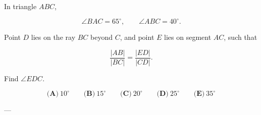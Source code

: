 In triangle \(ABC\),



\[
\angle BAC=65^\circ,\qquad \angle ABC=40^\circ.
\]

Point \(D\) lies on the ray \(BC\) beyond \(C\), and point \(E\) lies on segment \(AC\), such that



\[
\dfrac{|AB|}{|BC|}=\dfrac{|ED|}{|CD|}.
\]

Find \(\angle EDC\).



\[
\textbf{(A)}\ 10^\circ
\qquad
\textbf{(B)}\ 15^\circ
\qquad
\textbf{(C)}\ 20^\circ
\qquad
\textbf{(D)}\ 25^\circ
\qquad
\textbf{(E)}\ 35^\circ
\]

---
